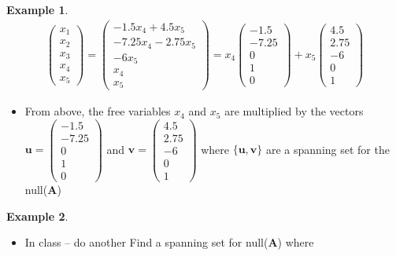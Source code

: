 \documentclass[
]{book}
\providecommand{\tightlist}{%
  \setlength{\itemsep}{0pt}\setlength{\parskip}{0pt}}
\theoremstyle{definition}
\theoremstyle{definition}
\newtheorem{example}{Example}[chapter]
\theoremstyle{definition}
\theoremstyle{definition}
\theoremstyle{remark}
\begin{document}
\begin{example}
\[
\begin{aligned}
\begin{pmatrix} x_1 \\ x_2 \\ x_3 \\ x_4 \\ x_5 \end{pmatrix} = \begin{pmatrix} -1.5 x_4 + 4.5 x_5\\ -7.25 x_4 - 2.75 x_5 \\ -6 x_5 \\ x_4 \\ x_5 \end{pmatrix} = x_4 \begin{pmatrix} -1.5 \\ -7.25 \\ 0 \\ 1 \\ 0 \end{pmatrix} + x_5 \begin{pmatrix} 4.5 \\ 2.75 \\ -6 \\ 0 \\ 1 \end{pmatrix}
\end{aligned}
\]

\begin{itemize}
\tightlist
\item
  From above, the free variables \(x_4\) and \(x_5\) are multiplied by the vectors \(\mathbf{u} = \begin{pmatrix} -1.5 \\ -7.25 \\ 0 \\ 1 \\ 0 \end{pmatrix}\) and \(\mathbf{v} = \begin{pmatrix} 4.5 \\ 2.75 \\ -6 \\ 0 \\ 1 \end{pmatrix}\) where \(\{ \mathbf{u}, \mathbf{v} \}\) are a spanning set for the null(\(\mathbf{A}\))
\end{itemize}

\end{example}

\begin{example}

\begin{itemize}
\tightlist
\item
  In class -- do another
  Find a spanning set for null(\(\mathbf{A}\)) where
\end{itemize}

\end{example}
\end{document}
